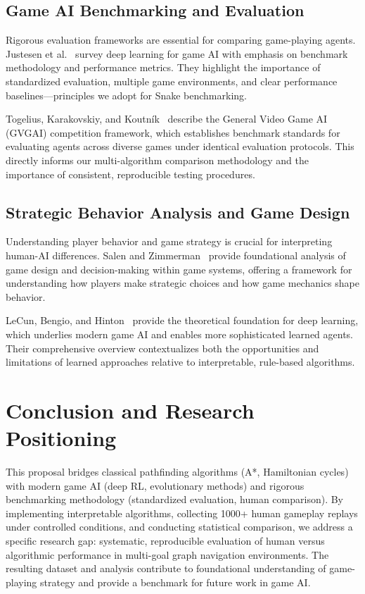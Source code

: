 \documentclass[a4paper]{article}
\begin{document}
\subsection{Game AI Benchmarking and Evaluation}

Rigorous evaluation frameworks are essential for comparing game-playing agents. Justesen et al.~\cite{Justesen2019} survey deep learning for game AI with emphasis on benchmark methodology and performance metrics. They highlight the importance of standardized evaluation, multiple game environments, and clear performance baselines—principles we adopt for Snake benchmarking.

Togelius, Karakovskiy, and Koutník~\cite{Togelius2009} describe the General Video Game AI (GVGAI) competition framework, which establishes benchmark standards for evaluating agents across diverse games under identical evaluation protocols. This directly informs our multi-algorithm comparison methodology and the importance of consistent, reproducible testing procedures.

\subsection{Strategic Behavior Analysis and Game Design}

Understanding player behavior and game strategy is crucial for interpreting human-AI differences. Salen and Zimmerman~\cite{Salen2003} provide foundational analysis of game design and decision-making within game systems, offering a framework for understanding how players make strategic choices and how game mechanics shape behavior.

LeCun, Bengio, and Hinton~\cite{LeCun2015} provide the theoretical foundation for deep learning, which underlies modern game AI and enables more sophisticated learned agents. Their comprehensive overview contextualizes both the opportunities and limitations of learned approaches relative to interpretable, rule-based algorithms.

\section*{Conclusion and Research Positioning}

This proposal bridges classical pathfinding algorithms (A*, Hamiltonian cycles) with modern game AI (deep RL, evolutionary methods) and rigorous benchmarking methodology (standardized evaluation, human comparison). By implementing interpretable algorithms, collecting 1000+ human gameplay replays under controlled conditions, and conducting statistical comparison, we address a specific research gap: systematic, reproducible evaluation of human versus algorithmic performance in multi-goal graph navigation environments. The resulting dataset and analysis contribute to foundational understanding of game-playing strategy and provide a benchmark for future work in game AI.
\end{document}
